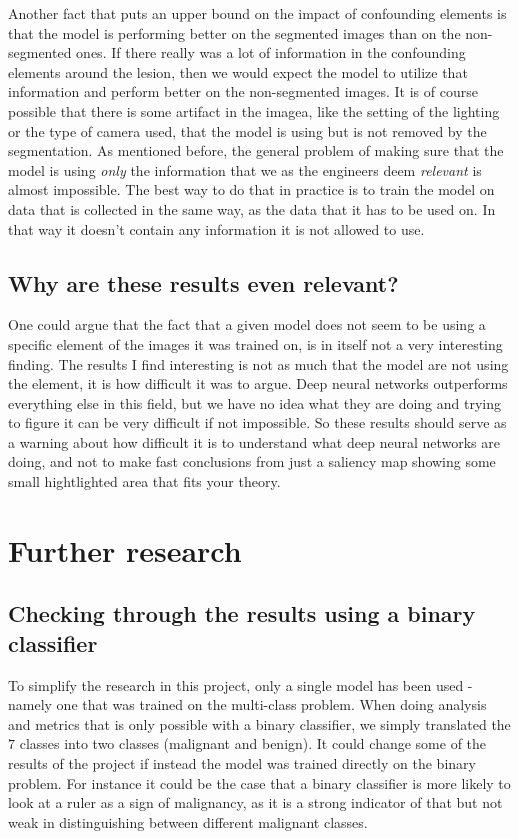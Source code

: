 Another fact that puts an upper bound on the impact of confounding elements is that the model
is performing better on the segmented images than on the non-segmented ones.
If there really was a lot of information in the confounding elements around the lesion,
then we would expect the model to utilize that information and perform better on the non-segmented images.
It is of course possible that there is some artifact in the imagea, like the setting of the lighting or the type of camera used,
that the model is using but is not removed by the segmentation.
As mentioned before, the general problem of making sure that the model is using \textit{only} the information that we as 
the engineers deem \textit{relevant} is almost impossible.
The best way to do that in practice is to train the model on data that is collected in the same way,
as the data that it has to be used on.
In that way it doesn't contain any information it is not allowed to use.

\subsection{Why are these results even relevant?}
One could argue that the fact that a given model does not seem to be using a specific element of the images it was trained on, 
is in itself not a very interesting finding.
The results I find interesting is not as much that the model are not using the element,
it is how difficult it was to argue.
Deep neural networks outperforms everything else in this field,
but we have no idea what they are doing and trying to figure it can be very difficult if not impossible.
So these results should serve as a warning about how difficult it is to understand what deep neural networks are doing,
and not to make fast conclusions from just a saliency map showing some small hightlighted area that fits your theory.

\section{Further research}
\subsection{Checking through the results using a binary classifier}
To simplify the research in this project, only a single model has been used - namely one that was trained on the multi-class problem.
When doing analysis and metrics that is only possible with a binary classifier,
we simply translated the $7$ classes into two classes (malignant and benign).
It could change some of the results of the project if instead the model was trained directly on the binary problem.
For instance it could be the case that a binary classifier is more likely to look at a ruler as a sign of malignancy,
as it is a strong indicator of that but not weak in distinguishing between different malignant classes.

